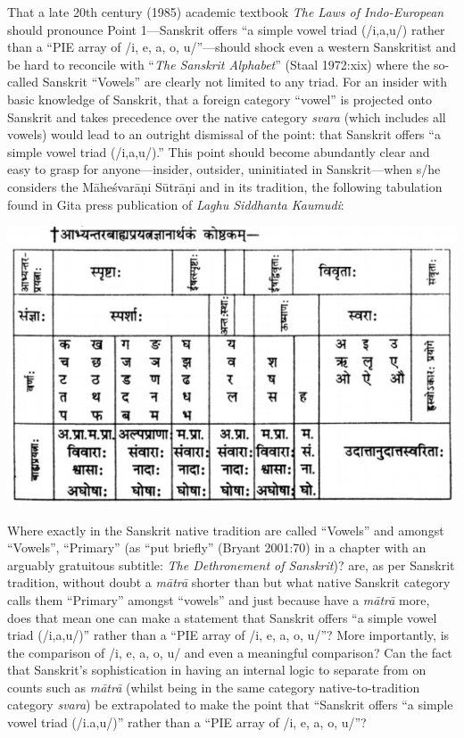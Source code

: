 That a late 20th century (1985) academic textbook \textit{The Laws of Indo-European} should pronounce Point 1—Sanskrit offers “a simple vowel triad (/i,a,u/) rather than a “PIE array of /i, e, a, o, u/”—should shock even a western Sanskritist and be hard to reconcile with “\textit{The Sanskrit Alphabet}” (Staal 1972:xix) where the so-called Sanskrit “Vowels” are clearly not limited to any triad. For an insider with basic knowledge of Sanskrit, that a foreign category “vowel” is projected onto Sanskrit and takes precedence over the native category \textit{svara} (which includes all vowels) would lead to an outright dismissal of the point: that Sanskrit offers “a simple vowel triad (/i,a,u/).” This point should become abundantly clear and easy to grasp for anyone—insider, outsider, uninitiated in Sanskrit—when s/he considers the Māheśvarāṇi Sūtrāṇi and in its tradition, the following tabulation found in Gita press publication of \textit{Laghu Siddhanta Kaumudi}:

\begin{center}
\includegraphics{"images/article-03/art03-fig01.png"}
\end{center}

Where exactly in the Sanskrit native tradition are  called “Vowels” and amongst “Vowels”, “Primary” (as “put briefly” (Bryant 2001:70) in a chapter with an arguably gratuitous subtitle: \textit{The Dethronement of Sanskrit})?  are, as per Sanskrit tradition, without doubt a \textit{mātrā} shorter than  but what native Sanskrit category calls them “Primary” amongst “vowels” and just because  have a \textit{mātrā} more, does that mean one can make a statement that Sanskrit offers “a simple vowel triad (/i,a,u/)” rather than a “PIE array of /i, e, a, o, u/”? More importantly, is the comparison of /i, e, a, o, u/ and  even a meaningful comparison? Can the fact that Sanskrit’s sophistication in having an internal logic to separate  from  on counts such as \textit{mātrā} (whilst being in the same category native-to-tradition category \textit{svara}) be extrapolated to make the point that “Sanskrit offers “a simple vowel triad (/i.a,u/)” rather than a “PIE array of /i, e, a, o, u/”?

